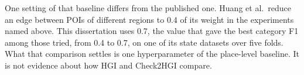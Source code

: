 One setting of that baseline differs from the published one. Huang et al.\ reduce an
edge between POIs of different regions to 0.4 of its weight in the experiments named
above. This dissertation uses 0.7, the value that gave the best category F1 among those
tried, from 0.4 to 0.7, on one of its state datasets over five folds. What that
comparison settles is one hyperparameter of
the place-level baseline. It is not evidence about how HGI and Check2HGI compare.
